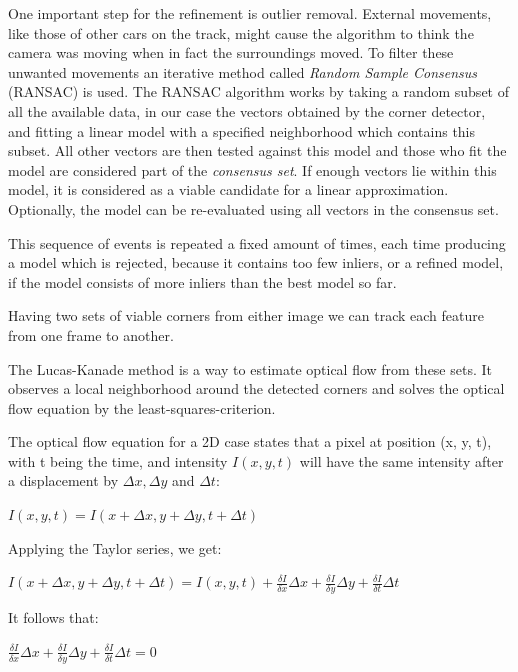 One important step for the refinement is outlier removal. External movements, like those of other cars on the track, might cause the algorithm to think the camera was moving when in fact the surroundings moved.
To filter these unwanted movements an iterative method called \textit{Random Sample Consensus} (RANSAC) is used. 
The RANSAC algorithm works by taking a random subset of all the available data, in our case the vectors obtained by the corner detector, and fitting a linear model with a specified neighborhood which contains this subset. All other vectors are then tested against this model and those who fit the model are considered part of the \textit{consensus set}.
If enough vectors lie within this model, it is considered as a viable candidate for a linear approximation. Optionally, the model can be re-evaluated using all vectors in the consensus set.

This sequence of events is repeated a fixed amount of times, each time producing a model which is rejected, because it contains too few inliers, or a refined model, if the model consists of more inliers than the best model so far.

Having two sets of viable corners from either image we can track each feature from one frame to another. 

The Lucas-Kanade method is a way to estimate optical flow from these sets. It observes a local neighborhood around the detected corners and solves the optical flow equation by the least-squares-criterion.

The optical flow equation for a 2D case states that a pixel at position (x, y, t), with t being the time, and intensity $I(x, y, t)$ will have the same intensity after a displacement by $\Delta x, \Delta y$ and $\Delta t$:

\begin{center}
\large
$I(x, y, t) = I(x + \Delta x, y + \Delta y, t + \Delta t)$
\normalsize
\end{center}

Applying the Taylor series, we get:

\begin{center}
\large
$I(x + \Delta x, y + \Delta y, t + \Delta t) = I(x, y, t) + \frac{\delta I}{\delta x}\Delta x + \frac{\delta I}{\delta y}\Delta y + \frac{\delta I}{\delta t}\Delta t$
\normalsize
\end{center}

It follows that: 

\begin{center}
\large
$\frac{\delta I}{\delta x}\Delta x + \frac{\delta I}{\delta y}\Delta y + \frac{\delta I}{\delta t}\Delta t = 0$
\normalsize
\end{center}

